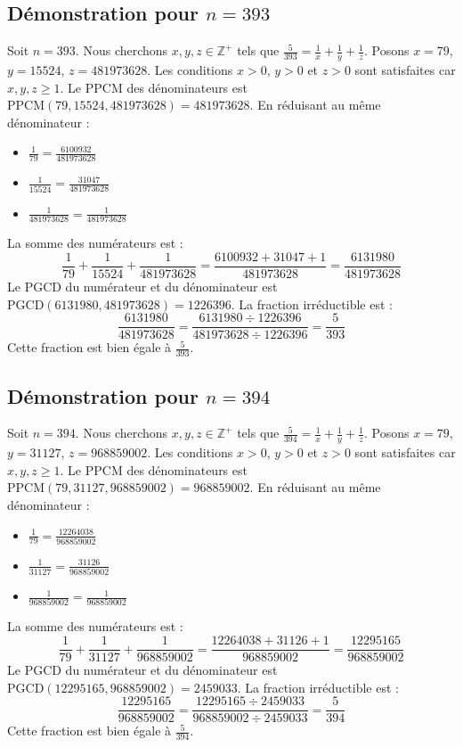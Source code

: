 \documentclass[11pt,a4paper]{article}
\begin{document}
\subsection{Démonstration pour $n = 393$}
Soit $n = 393$. Nous cherchons $x, y, z \in \mathbb{Z}^{+}$ tels que $\frac{5}{393} = \frac{1}{x} + \frac{1}{y} + \frac{1}{z}$.
Posons $x = 79$, $y = 15524$, $z = 481973628$.
Les conditions $x > 0$, $y > 0$ et $z > 0$ sont satisfaites car $x, y, z \geq 1$.
Le PPCM des dénominateurs est $\text{PPCM}(79, 15524, 481973628) = 481973628$.
En réduisant au même dénominateur :
\begin{itemize}
    \item $\frac{1}{79} = \frac{6100932}{481973628}$
    \item $\frac{1}{15524} = \frac{31047}{481973628}$
    \item $\frac{1}{481973628} = \frac{1}{481973628}$
\end{itemize}
La somme des numérateurs est :
$$ \frac{1}{79} + \frac{1}{15524} + \frac{1}{481973628} = \frac{6100932 + 31047 + 1}{481973628} = \frac{6131980}{481973628} $$
Le PGCD du numérateur et du dénominateur est $\text{PGCD}(6131980, 481973628) = 1226396$.
La fraction irréductible est :
$$ \frac{6131980}{481973628} = \frac{6131980 \div 1226396}{481973628 \div 1226396} = \frac{5}{393} $$
Cette fraction est bien égale à $\frac{5}{393}$.

\subsection{Démonstration pour $n = 394$}
Soit $n = 394$. Nous cherchons $x, y, z \in \mathbb{Z}^{+}$ tels que $\frac{5}{394} = \frac{1}{x} + \frac{1}{y} + \frac{1}{z}$.
Posons $x = 79$, $y = 31127$, $z = 968859002$.
Les conditions $x > 0$, $y > 0$ et $z > 0$ sont satisfaites car $x, y, z \geq 1$.
Le PPCM des dénominateurs est $\text{PPCM}(79, 31127, 968859002) = 968859002$.
En réduisant au même dénominateur :
\begin{itemize}
    \item $\frac{1}{79} = \frac{12264038}{968859002}$
    \item $\frac{1}{31127} = \frac{31126}{968859002}$
    \item $\frac{1}{968859002} = \frac{1}{968859002}$
\end{itemize}
La somme des numérateurs est :
$$ \frac{1}{79} + \frac{1}{31127} + \frac{1}{968859002} = \frac{12264038 + 31126 + 1}{968859002} = \frac{12295165}{968859002} $$
Le PGCD du numérateur et du dénominateur est $\text{PGCD}(12295165, 968859002) = 2459033$.
La fraction irréductible est :
$$ \frac{12295165}{968859002} = \frac{12295165 \div 2459033}{968859002 \div 2459033} = \frac{5}{394} $$
Cette fraction est bien égale à $\frac{5}{394}$.
\end{document}
